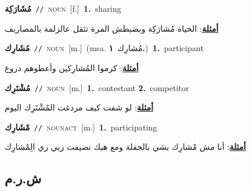 \documentclass[10pt,a4paper,twoside]{article} %
\begin{document}
\begin{multicols}{2}
{\setlength\topsep{0pt}\textbf{\foreignlanguage{arabic}{مُشَارَكِة}}\ {\color{gray}\texttt{//}\color{black}}\ \textsc{noun}\ [f.]\ \textbf{1.}~sharing\  \begin{flushright}\color{gray}\foreignlanguage{arabic}{\textbf{\underline{\foreignlanguage{arabic}{أمثلة}}}: الحياة مُشارَكِة وبضبطش المرة تثقل عالزلمة بالمصاريف}\end{flushright}\color{black}} \vspace{2mm}

{\setlength\topsep{0pt}\textbf{\foreignlanguage{arabic}{مُشَارِك}}\ {\color{gray}\texttt{//}\color{black}}\ \textsc{noun}\ [m.]\ \color{gray}(msa. \foreignlanguage{arabic}{مُشارِك}~\foreignlanguage{arabic}{\textbf{١.}})\color{black}\ \textbf{1.}~participant\  \begin{flushright}\color{gray}\foreignlanguage{arabic}{\textbf{\underline{\foreignlanguage{arabic}{أمثلة}}}: كرموا المُشارِكين وأعطوهم دروع}\end{flushright}\color{black}} \vspace{2mm}

{\setlength\topsep{0pt}\textbf{\foreignlanguage{arabic}{مُشْتَرِك}}\ {\color{gray}\texttt{//}\color{black}}\ \textsc{noun}\ [m.]\ \textbf{1.}~contestant  \textbf{2.}~competitor\  \begin{flushright}\color{gray}\foreignlanguage{arabic}{\textbf{\underline{\foreignlanguage{arabic}{أمثلة}}}: لو شفت كيف مردغت المُشْتَرِك اليوم}\end{flushright}\color{black}} \vspace{2mm}

{\setlength\topsep{0pt}\textbf{\foreignlanguage{arabic}{مْشَارِك}}\ {\color{gray}\texttt{//}\color{black}}\ \textsc{noun\textunderscore act}\ [m.]\ \textbf{1.}~participating\  \begin{flushright}\color{gray}\foreignlanguage{arabic}{\textbf{\underline{\foreignlanguage{arabic}{أمثلة}}}: أنا مش مْشارِك بشي بالحفلة ومع هيك تضيفت زيي زي الِمْشارِك}\end{flushright}\color{black}} \vspace{2mm}

\vspace{-3mm}
\subsection*{\color{blue}\foreignlanguage{arabic}{ش.ر.م}\color{blue}{}} 


\end{multicols}
\end{document}
